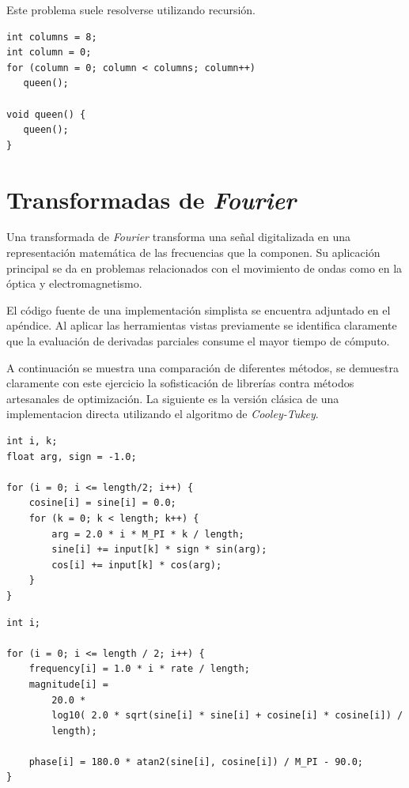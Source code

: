 \documentclass[a4paper]{report}
\begin{document}
Este problema suele resolverse utilizando recursi\'on.

\begin{verbatim}
int columns = 8;
int column = 0;
for (column = 0; column < columns; column++)
   queen();

void queen() {
   queen();
}
\end{verbatim}

\section{Transformadas de {\it Fourier}}

Una transformada de {\it Fourier} \cite{fourier} transforma una se\~nal
digitalizada en una representaci\'on matem\'atica de las frecuencias que la
componen. Su aplicaci\'on principal se da en problemas relacionados con el
movimiento de ondas como en la \'optica y electromagnetismo.

\bigskip

El c\'odigo fuente de una implementaci\'on simplista se encuentra adjuntado en
el ap\'endice. Al aplicar las herramientas vistas previamente se identifica
claramente que la evaluaci\'on de derivadas parciales consume el mayor tiempo
de c\'omputo.

\bigskip

A continuaci\'on se muestra una comparaci\'on de diferentes m\'etodos, se
demuestra claramente con este ejercicio la sofisticaci\'on de librer\'ias
contra m\'etodos artesanales de optimizaci\'on. La siguiente es la versi\'on
cl\'asica de una implementacion directa utilizando el algoritmo de
{\it Cooley-Tukey}.

\begin{verbatim}
int i, k;
float arg, sign = -1.0;

for (i = 0; i <= length/2; i++) {
    cosine[i] = sine[i] = 0.0;
    for (k = 0; k < length; k++) {
        arg = 2.0 * i * M_PI * k / length;
        sine[i] += input[k] * sign * sin(arg);
        cos[i] += input[k] * cos(arg);
    }
}
\end{verbatim}

\begin{verbatim}
int i;

for (i = 0; i <= length / 2; i++) {
    frequency[i] = 1.0 * i * rate / length;
    magnitude[i] =
        20.0 *
        log10( 2.0 * sqrt(sine[i] * sine[i] + cosine[i] * cosine[i]) /
        length);

    phase[i] = 180.0 * atan2(sine[i], cosine[i]) / M_PI - 90.0;
}
\end{verbatim}
\end{document}
